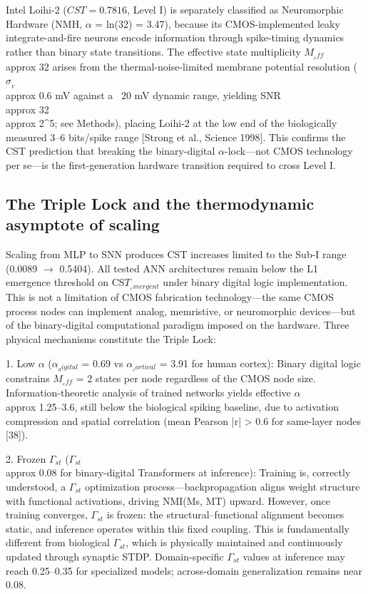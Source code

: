 \documentclass[a4paper,12pt]{article}
\begin{document}
Intel Loihi-2 ($CST = 0.7816$, Level I) is separately classified as Neuromorphic Hardware (NMH, $\alpha$ = ln(32) = 3.47), because its CMOS-implemented leaky integrate-and-fire neurons encode information through spike-timing dynamics rather than binary state transitions. The effective state multiplicity $M_{_eff}$  \\approx  32 arises from the thermal-noise-limited membrane potential resolution ($\sigma_{_V}$  \\approx  0.6 mV against a ~20 mV dynamic range, yielding SNR  \\approx  32  \\approx  2^5; see Methods), placing Loihi-2 at the low end of the biologically measured 3--6 bits/spike range [Strong et al., Science 1998]. This confirms the CST prediction that breaking the binary-digital $\alpha$-lock---not CMOS technology per se---is the first-generation hardware transition required to cross Level I.



\subsection{The Triple Lock and the thermodynamic asymptote of scaling}

Scaling from MLP to SNN produces CST increases limited to the Sub-I range (0.0089 $\rightarrow$ 0.5404). All tested ANN architectures remain below the L1 emergence threshold on CS$T_{_emergent}$ under binary digital logic implementation. This is not a limitation of CMOS fabrication technology---the same CMOS process nodes can implement analog, memristive, or neuromorphic devices---but of the binary-digital computational paradigm imposed on the hardware. Three physical mechanisms constitute the Triple Lock:


1. Low $\alpha$ ($\alpha_{_digital}$ = 0.69 vs $\alpha_{_cortical}$ = 3.91 for human cortex): Binary digital logic constrains $M_{_eff}$ = 2 states per node regardless of the CMOS node size. Information-theoretic analysis of trained networks yields effective $\alpha$  \\approx  1.25--3.6, still below the biological spiking baseline, due to activation compression and spatial correlation (mean Pearson |r| > 0.6 for same-layer nodes [38]).


2. Frozen $\Gamma_{st}$ ($\Gamma_{st}$  \\approx  0.08 for binary-digital Transformers at inference): Training is, correctly understood, a $\Gamma_{st}$ optimization process---backpropagation aligns weight structure with functional activations, driving NMI(Ms, MT) upward. However, once training converges, $\Gamma_{st}$ is frozen: the structural--functional alignment becomes static, and inference operates within this fixed coupling. This is fundamentally different from biological $\Gamma_{st}$, which is physically maintained and continuously updated through synaptic STDP. Domain-specific $\Gamma_{st}$ values at inference may reach 0.25--0.35 for specialized models; across-domain generalization remains near 0.08.
\end{document}
